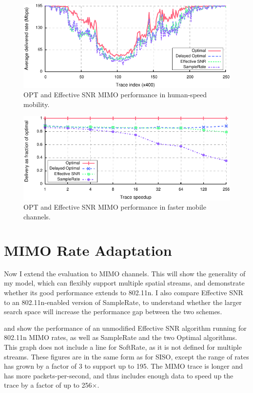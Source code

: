 \begin{figure}[t]
      \centering
      \includegraphics[width=\textwidth]{figures/rate/mimo_rate_time.pdf}
      \caption[OPT and Effective SNR MIMO performance in human-speed mobility]{\label{fig:mimo_eff_snr_time} OPT and Effective SNR MIMO performance in human-speed mobility.}
\end{figure}

\begin{figure}[ht]
      \centering
      \includegraphics[width=\textwidth]{figures/rate/mimo_rate_skip_ratio.pdf}
      \caption[OPT and Effective SNR MIMO performance in fast mobile channels]{\label{fig:mimo_eff_snr_speedup} OPT and Effective SNR MIMO performance in faster mobile channels.}
\end{figure}

\section{MIMO Rate Adaptation}
Now I extend the evaluation to MIMO channels. This will show the generality of my model, which can flexibly support multiple spatial streams, and demonstrate whether its good performance extends to 802.11n. I also compare Effective SNR to an 802.11n-enabled version of SampleRate, to understand whether the larger search space will increase the performance gap between the two schemes.

 and  show the performance of an unmodified Effective SNR algorithm running for 802.11n MIMO rates, as well as SampleRate and the two Optimal algorithms. This graph does not include a line for SoftRate, as it is not defined for multiple streams.
These figures are in the same form as for SISO, except the range of rates has grown by a factor of 3 to support up to 195\Mbps. The MIMO trace is longer and has more packets-per-second, and thus includes enough data to speed up the trace by a factor of up to 256$\times$.

